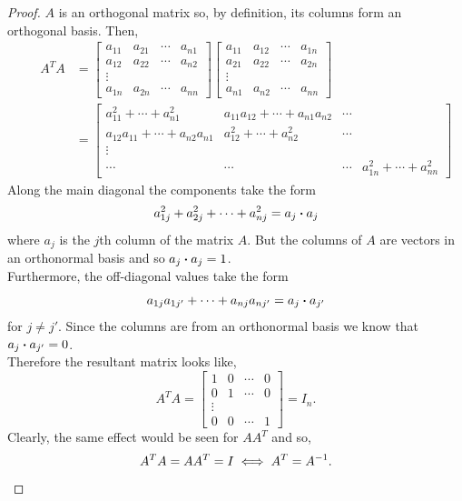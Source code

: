 \documentclass[MathsNotesBase.tex]{subfiles}
\begin{document}
{		\medskip
		\begin{proof}
			$A$ is an orthogonal matrix so, by definition, its columns form an orthogonal basis. Then,
			\begin{align*}
			&& A^TA &=
					\begin{bmatrix}
						a_{11} & a_{21} & \cdots & a_{n1}\\
						a_{12} & a_{22} & \cdots & a_{n2}\\
						\vdots \\
						a_{1n} & a_{2n} & \cdots & a_{nn}
					\end{bmatrix}
					\begin{bmatrix}
						a_{11} & a_{12} & \cdots & a_{1n}\\
						a_{21} & a_{22} & \cdots & a_{2n}\\
						\vdots \\
						a_{n1} & a_{n2} & \cdots & a_{nn}
					\end{bmatrix} \\
			&&  &= \begin{bmatrix}
						a_{11}^2 + \cdots + a_{n1}^2 & a_{11}a_{12} + \cdots + a_{n1}a_{n2} & \cdots\\
						a_{12}a_{11} + \cdots + a_{n2}a_{n1} & a_{12}^2 + \cdots + a_{n2}^2 & \cdots\\
						\vdots \\
						\cdots & \cdots & \cdots & a_{1n}^2 + \cdots + a_{nn}^2
					\end{bmatrix}
			\end{align*}
			Along the main diagonal the components take the form
			\[ a_{1j}^2 + a_{2j}^2 + \cdots + a_{nj}^2 = a_j \boldsymbol{\cdot} a_j \]
			where ${ a_j }$ is the $j$th column of the matrix $A$. But the columns of $A$ are vectors in an orthonormal basis and so ${ a_j \boldsymbol{\cdot} a_j= 1 }$.\\
			Furthermore, the off-diagonal values take the form
			\[ a_{1j}a_{1j'} + \cdots + a_{nj}a_{nj'} = a_j \boldsymbol{\cdot} a_{j'} \]
			for ${ j \neq j' }$. Since the columns are from an orthonormal basis we know that ${ a_j \boldsymbol{\cdot} a_{j'} = 0 }$.\\
			Therefore the resultant matrix looks like,
			\[ A^TA = \begin{bmatrix}
						1 & 0 & \cdots & 0\\
						0 & 1 & \cdots & 0\\
						\vdots\\
						0 & 0 & \cdots & 1
					  \end{bmatrix}
					  = I_n.
			\]
			Clearly, the same effect would be seen for ${ AA^T }$ and so,
			\[ A^TA = AA^T = I \iff A^T = {A}^{-1}. \qedhere \]
		\end{proof}
	
}
\end{document}
